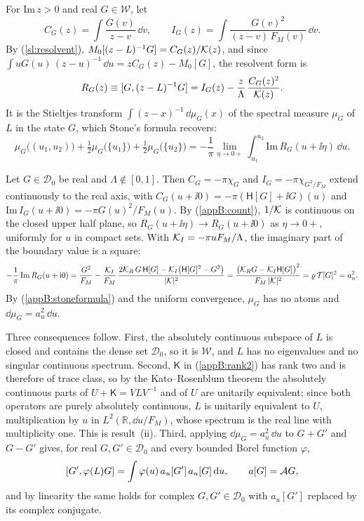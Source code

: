For $\mathrm{Im}\,z>0$ and real $G\in\mathcal W$, let
\begin{equation*}
  C_G(z)=\int\frac{G(v)}{z-v}\,\dd v,\qquad I_G(z)=\int\frac{G(v)^2}{(z-v)\,F_M(v)}\,\dd v .
\end{equation*}
By (\ref{sl:resolvent}), $M_0[(z-L)^{-1}G]=C_G(z)/\mathcal K(z)$, and since $\int uG(u)\,(z-u)^{-1}\,\dd u=zC_G(z)-M_0[G]$, the resolvent form is
\begin{equation*}
  R_G(z)\equiv[G,(z-L)^{-1}G]=I_G(z)-\frac{z}{\Lambda}\,\frac{C_G(z)^2}{\mathcal K(z)} .
\end{equation*}
It is the Stieltjes transform $\int(z-x)^{-1}\,\dd\mu_G(x)$ of the spectral measure $\mu_G$ of $L$ in the state $G$, which Stone's formula recovers:
\begin{equation}\label{appB:stoneformula}
  \mu_G\big((u_1,u_2)\big)+\tfrac12\mu_G\big(\{u_1\}\big)+\tfrac12\mu_G\big(\{u_2\}\big)
  =-\frac{1}{\pi}\lim_{\eta\to0+}\int_{u_1}^{u_2}\mathrm{Im}\,R_G(u+\ii\eta)\,\dd u .
\end{equation}

Let $G\in\mathcal D_0$ be real and $\Lambda\notin[0,1]$. Then $C_G=-\pi\chi_G$ and $I_G=-\pi\chi_{G^2/F_M}$ extend continuously to the real axis, with $C_G(u+\ii0)=-\pi(\mathsf H[G]+\ii G)(u)$ and $\mathrm{Im}\,I_G(u+\ii0)=-\pi G(u)^2/F_M(u)$. By (\ref{appB:count}), $1/\mathcal K$ is continuous on the closed upper half plane, so $R_G(u+\ii\eta)\to R_G(u+\ii0)$ as $\eta\to0+$, uniformly for $u$ in compact sets. With $\mathcal K_I=-\pi uF_M/\Lambda$, the imaginary part of the boundary value is a square:
\begin{equation*}
  -\frac{1}{\pi}\,\mathrm{Im}\,R_G(u+\mathrm{i}0)
  =\frac{G^2}{F_M}-\frac{\mathcal K_I}{F_M}\,\frac{2\mathcal K_R\,G\,\mathsf H[G]-\mathcal K_I\big(\mathsf H[G]^2-G^2\big)}{|\mathcal K|^2}
  =\frac{\big(\mathcal K_RG-\mathcal K_I\mathsf H[G]\big)^2}{F_M\,|\mathcal K|^2}
  =\varrho\,\mathcal T[G]^2=a_u^2 .
\end{equation*}
By (\ref{appB:stoneformula}) and the uniform convergence, $\mu_G$ has no atoms and $\dd\mu_G=a_u^2\,\dd u$.

Three consequences follow. First, the absolutely continuous subspace of $L$ is closed and contains the dense set $\mathcal D_0$, so it is $\mathcal W$, and $L$ has no eigenvalues and no singular continuous spectrum. Second, $\mathsf K$ in (\ref{appB:rank2}) has rank two and is therefore of trace class, so by the Kato--Rosenblum theorem \citep[][chapter~X]{Kato1966} the absolutely continuous parts of $U+\mathsf K=VLV^{-1}$ and of $U$ are unitarily equivalent; since both operators are purely absolutely continuous, $L$ is unitarily equivalent to $U$, multiplication by $u$ in $L^2(\mathbb R,\dd u/F_M)$, whose spectrum is the real line with multiplicity one. This is result~(ii). Third, applying $\dd\mu_G=a_u^2\,\dd u$ to $G+G'$ and $G-G'$ gives, for real $G,G'\in\mathcal D_0$ and every bounded Borel function $\varphi$,
\begin{equation}\label{appB:polar}
  [G',\varphi(L)G]=\int\varphi(u)\,a_u[G']\,a_u[G]\,\mathrm{d} u,\qquad a[G]=\mathcal AG ,
\end{equation}
and by linearity the same holds for complex $G,G'\in\mathcal D_0$ with $a_u[G']$ replaced by its complex conjugate.

